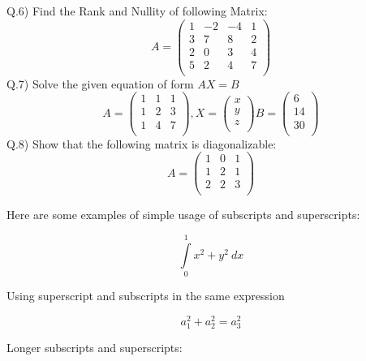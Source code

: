 \documentclass[12pt]{article}
\begin{document}
	
	\begin{flushleft}
		Q.6) Find the Rank and Nullity of following Matrix:
		\[
		A=
		\begin{pmatrix}
			1 & -2 & -4 & 1 \\
			3 & 7  & 8  & 2 \\
			2 & 0  & 3  & 4 \\
			5 & 2  & 4  & 7 \\
		\end{pmatrix}
		\]
		Q.7) Solve the given equation of form $AX=B$
		\[
		A=
		\begin{pmatrix}
			1 & 1 & 1 \\
			1 & 2 & 3 \\
			1 & 4 & 7 \\
		\end{pmatrix}
		,
		X=
		\begin{pmatrix}
			x \\
			y \\
			z \\
		\end{pmatrix}
		B=
		\begin{pmatrix}
			6  \\
			14 \\
			30 \\
		\end{pmatrix}
		\]
		Q.8) Show that the following matrix is diagonalizable:
		\[
		A=
		\begin{pmatrix}
			1 & 0 & 1 \\
			1 & 2 & 1 \\
			2 & 2 & 3 \\
		\end{pmatrix}
		\]
	\end{flushleft}
	
	
	
	
	
	
	
	
	\newpage
	
	Here are some examples of simple usage of subscripts and superscripts:
	
	\[ \int\limits_0^1 x^2 + y^2 \ dx \]
	
	\vspace{1cm}
	
	Using superscript and subscripts in the same expression
	
	\[ a_1^2 + a_2^2 = a_3^2 \]
	
	\vspace{1cm}
	
	Longer subscripts and superscripts:
	
\end{document}
